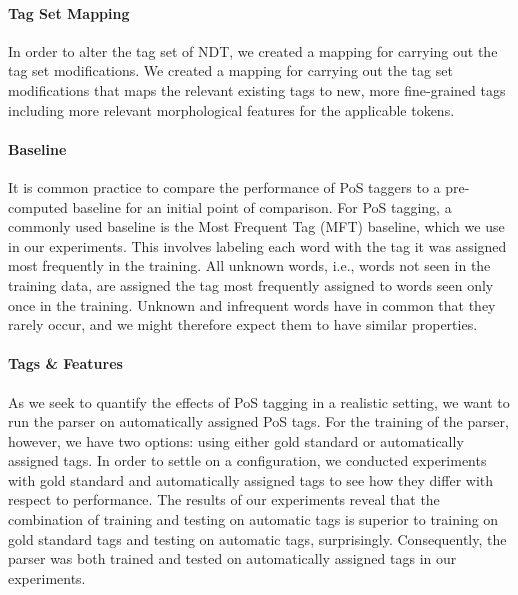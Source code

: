 \documentclass[11pt,a4paper]{article}
\begin{document}
\paragraph{Tag Set Mapping}
In order to alter the tag set of NDT, we created a mapping for carrying out the
tag set modifications. We created a mapping for carrying out the tag set
modifications that maps the relevant existing tags to new, more fine-grained
tags including more relevant morphological features for the applicable tokens.

\paragraph{Baseline}
It is common practice to compare the performance of PoS taggers to a
pre-computed baseline for an initial point of comparison.
For PoS tagging, a commonly used baseline is the Most Frequent Tag (MFT)
baseline, which we use in our experiments. This involves labeling each word
with the tag it was assigned most frequently in the training. All unknown
words, i.e., words not seen in the training data, are assigned the tag most
frequently assigned to words seen only once in the training. Unknown and
infrequent words have in common that they rarely occur, and we might therefore
expect them to have similar properties.

\paragraph{Tags \& Features}
As we seek to quantify the effects of PoS tagging in a realistic setting, we
want to run the parser on automatically assigned PoS tags. For the training of
the parser, however, we have two options: using either gold standard or
automatically assigned tags. In order to settle on a configuration, we
conducted experiments with gold standard and automatically assigned tags to see
how they differ with respect to performance. The results of our experiments
reveal that the combination of training and testing on automatic tags is
superior to training on gold standard tags and testing on automatic tags,
surprisingly. Consequently, the parser was both trained and tested on
automatically assigned tags in our experiments.
\end{document}

